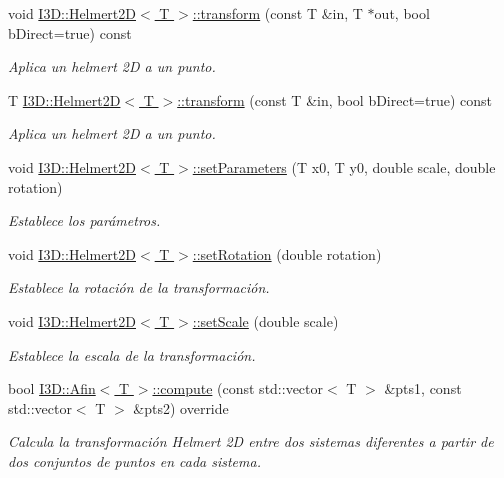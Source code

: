 \begin{DoxyCompactItemize}
void \hyperlink{group__trf2_d_group_ga11e1634259f4e3085840a16c3bfb314e}{I3\+D\+::\+Helmert2\+D$<$ T $>$\+::transform} (const T \&in, T $\ast$out, bool b\+Direct=true) const 
\begin{DoxyCompactList}\small\item\em Aplica un helmert 2D a un punto. \end{DoxyCompactList}\item 
T \hyperlink{group__trf2_d_group_gaa9495c4b5fe0dbfb703a2004b41e310b}{I3\+D\+::\+Helmert2\+D$<$ T $>$\+::transform} (const T \&in, bool b\+Direct=true) const 
\begin{DoxyCompactList}\small\item\em Aplica un helmert 2D a un punto. \end{DoxyCompactList}\item 
void \hyperlink{group__trf2_d_group_ga792554ed5f33a824b0c619e156697022}{I3\+D\+::\+Helmert2\+D$<$ T $>$\+::set\+Parameters} (T x0, T y0, double scale, double rotation)
\begin{DoxyCompactList}\small\item\em Establece los parámetros. \end{DoxyCompactList}\item 
void \hyperlink{group__trf2_d_group_gaf7d2a6c0aeeb81c66b8e07e55236a6d2}{I3\+D\+::\+Helmert2\+D$<$ T $>$\+::set\+Rotation} (double rotation)
\begin{DoxyCompactList}\small\item\em Establece la rotación de la transformación. \end{DoxyCompactList}\item 
void \hyperlink{group__trf2_d_group_gaa732c2f1d68f41b1ab4ca63aa40b21df}{I3\+D\+::\+Helmert2\+D$<$ T $>$\+::set\+Scale} (double scale)
\begin{DoxyCompactList}\small\item\em Establece la escala de la transformación. \end{DoxyCompactList}\item 
bool \hyperlink{group__trf2_d_group_gabe12d714c522dd1bf40f05f28c5aafe0}{I3\+D\+::\+Afin$<$ T $>$\+::compute} (const std\+::vector$<$ T $>$ \&pts1, const std\+::vector$<$ T $>$ \&pts2) override
\begin{DoxyCompactList}\small\item\em Calcula la transformación Helmert 2D entre dos sistemas diferentes a partir de dos conjuntos de puntos en cada sistema. \end{DoxyCompactList}\item 

\end{DoxyCompactItemize}
